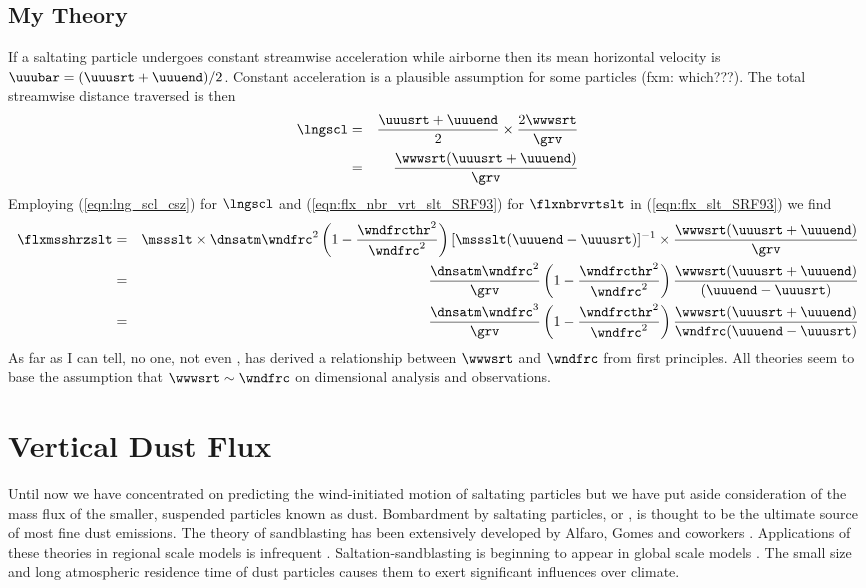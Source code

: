 \documentclass[12pt,twoside]{book}
\begin{document}
\subsection[My Theory]{My Theory}\label{sxn:hrz_csz}
If a saltating particle undergoes constant streamwise acceleration
while airborne then its mean horizontal velocity is 
$\uuubar = (\uuusrt + \uuuend) / 2$.
Constant acceleration is a plausible assumption for some particles
(fxm: which???). 
The total streamwise distance traversed is then
\begin{eqnarray}
\lngscl & = & \frac{\uuusrt + \uuuend}{2} \times 
\frac{2 \wwwsrt}{\grv } \nonumber \\
& = & \frac{\wwwsrt ( \uuusrt + \uuuend )}{\grv }
\label{eqn:lng_scl_csz}
\end{eqnarray}
Employing (\ref{eqn:lng_scl_csz}) for $\lngscl$ and
(\ref{eqn:flx_nbr_vrt_slt_SRF93}) for $\flxnbrvrtslt$ in 
(\ref{eqn:flx_slt_SRF93}) we find  
\begin{eqnarray}
\flxmsshrzslt & = & 
\mssslt \times
\dnsatm \wndfrc^{2} \left( 1 - \frac{\wndfrcthr^{2}}{\wndfrc^{2} } \right)
[ \mssslt ( \uuuend - \uuusrt ) ]^{-1} \times
\frac{\wwwsrt ( \uuusrt + \uuuend )}{\grv } \nonumber \\
& = & 
\frac{\dnsatm \wndfrc^{2}}{\grv }
\left( 1 - \frac{\wndfrcthr^{2}}{\wndfrc^{2} } \right)
\frac{\wwwsrt ( \uuusrt + \uuuend )}{( \uuuend - \uuusrt ) }  \nonumber \\
& = & 
\frac{\dnsatm \wndfrc^{3}}{\grv }
\left( 1 - \frac{\wndfrcthr^{2}}{\wndfrc^{2} } \right)
\frac{\wwwsrt ( \uuusrt + \uuuend )}{\wndfrc ( \uuuend - \uuusrt ) } 
\label{eqn:flx_hrz_csz}
\end{eqnarray}
As far as I can tell, no one, not even \cite{Owe64}, has derived a
relationship between $\wwwsrt$ and $\wndfrc$ from first principles.   
All theories seem to base the assumption that 
$\wwwsrt \sim \wndfrc$ on dimensional analysis and observations.

\section{Vertical Dust Flux}\label{sxn:vrt}
Until now we have concentrated on predicting the wind-initiated motion
of saltating particles but we have put aside consideration of the mass
flux of the smaller, suspended particles known as dust.
Bombardment by saltating particles, or , is
thought to be the ultimate source of most fine dust emissions.
The theory of sandblasting has been extensively developed by Alfaro,
Gomes and coworkers \cite[]{GBC90,AlG95,AGG97,AGG98,AlG01}.
Applications of these theories in regional scale models is infrequent
\cite[][]{SRL96,ShL97,GZZ03}.
Saltation-sandblasting is beginning to appear in global scale models 
\cite[][]{GrZ04,GMZ05}.
The small size and long atmospheric residence time of dust particles
causes them to exert significant influences over climate.
\end{document}
